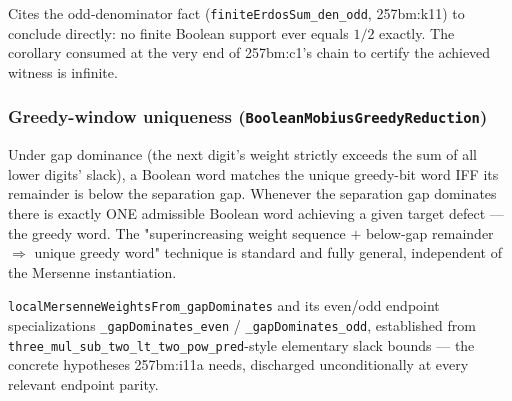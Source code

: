 \begin{prop}
Cites the odd-denominator fact (\texttt{finiteErdosSum\_den\_odd}, 257bm:k11) to conclude directly: no finite Boolean
support ever equals $1/2$ exactly. The corollary consumed at the very end of 257bm:c1's chain to
certify the achieved witness is infinite.
\par\noindent{}   
\end{prop}

\subsubsection*{Greedy-window uniqueness (\texttt{BooleanMobiusGreedyReduction})}

\begin{thm}
Under gap dominance (the next digit's weight strictly exceeds the sum of all lower digits'
slack), a Boolean word matches the unique greedy-bit word IFF its remainder is below the
separation gap. Whenever the separation gap dominates there is exactly ONE admissible Boolean
word achieving a given target defect — the greedy word. The "superincreasing weight sequence $+$
below-gap remainder $\Rightarrow$ unique greedy word" technique is standard and fully general,
independent of the Mersenne instantiation.
\par\noindent{}   
\end{thm}

\begin{prop}
\texttt{localMersenneWeightsFrom\_gapDominates} and its even/odd endpoint specializations
\texttt{\_gapDominates\_even} / \texttt{\_gapDominates\_odd}, established from
\texttt{three\_mul\_sub\_two\_lt\_two\_pow\_pred}-style elementary slack bounds — the concrete
hypotheses 257bm:i11a needs, discharged unconditionally at every relevant endpoint parity.
\par\noindent{}     
\end{prop}

